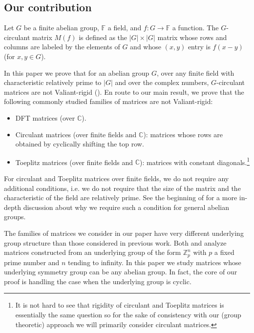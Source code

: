 \documentclass{toc}
\newcommand\F{{\mathbb{F}}}
\renewcommand\Z{{\mathbb{Z}}}
\renewcommand\C{{\mathbb{C}}}
\begin{document}
\subsection{Our contribution} 
%
%
%
\begin{definition}
Let $G$ be a finite abelian group, $\F$ a field, and $f : G\to\F$
a function.  The $G$-circulant matrix $M(f)$ is defined as the
$|G|\times |G|$ matrix whose rows and columns are labeled by
the elements of $G$ and whose $(x,y)$ entry is $f(x-y)$
(for $x,y\in G$).
\end{definition}   %
%
In this paper we prove that for an abelian group $G$, over any finite field with characteristic relatively prime to $|G|$
and over the complex numbers, $G$-circulant matrices %
%
%
%
are not Valiant-rigid (). 
En route to our main result, we prove that the following
commonly studied families of matrices are not Valiant-rigid:
\begin{itemize}
\item  
DFT matrices (over $\C$).   %
%
%
%
%
%
    \item Circulant matrices (over finite fields and $\C$): matrices whose rows are obtained by cyclically shifting the top row.
    \item Toeplitz matrices (over finite fields and $\C$): matrices with constant diagonals.\footnote{It is not hard to see that rigidity of circulant and Toeplitz matrices is essentially the same question so for the sake of consistency with our (group theoretic)  approach we will primarily consider circulant matrices.}
\end{itemize}
\begin{remark}
For circulant and Toeplitz matrices over finite fields, we do not require any additional conditions, i.e. we do not require that the size of the matrix and the characteristic of the field are relatively prime.  See the beginning of  for a more in-depth discussion about why we require such a condition for general abelian groups.
\end{remark}
The families of matrices we consider in our paper  
have very different underlying group structure than those
considered in previous work.  Both
\cite{old_hadamard} and \cite{CLP}
analyze matrices constructed from an underlying group of the form
$\Z_p^n$ with $p$ a fixed prime number and $n$ tending to infinity.  
In this paper we study matrices whose underlying symmetry group can
be any abelian group.  In fact, the core of our proof is handling the
case when the underlying group is cyclic.
\end{document}
